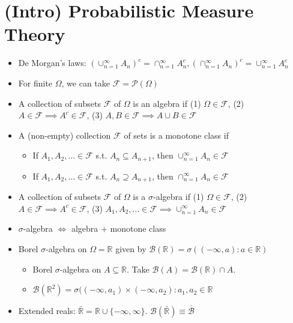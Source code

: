 \section{(Intro) Probabilistic Measure Theory}
\begin{itemize}
    \item De Morgan's laws: $\displaystyle\left(\cup_{n=1}^\infty A_n\right)^c = \cap_{n=1}^\infty A_n^c, \left(\cap_{n=1}^\infty A_n\right)^c = \cup_{n=1}^\infty A_n^c$
    \item For finite $\Omega$, we can take $\mathcal{F} = \mathcal{P}(\Omega)$
    \item A collection of subsets $\mathcal{F}$ of $\Omega$ is an algebra if (1) $\Omega \in \mathcal{F}$, (2) $A \in \mathcal{F} \implies A^c \in \mathcal{F}$, (3) $A, B \in \mathcal{F} \implies A \cup B \in \mathcal{F}$
    \item A (non-empty) collection $\mathcal{F}$ of sets is a monotone class if
    \begin{itemize}
        \item If $A_1, A_2, \dots \in \mathcal{F}$ s.t. $A_n \subseteq A_{n+1}$, then $\cup_{n=1}^\infty A_n \in \mathcal{F}$
        \item If $A_1, A_2, \dots \in \mathcal{F}$ s.t. $A_n \supseteq A_{n+1}$, then $\cap_{n=1}^\infty A_n \in \mathcal{F}$
    \end{itemize}
    \item A collection of subsets $\mathcal{F}$ of $\Omega$ is a $\sigma$-algebra if (1) $\Omega \in \mathcal{F}$, (2) $A \in \mathcal{F} \implies A^c \in \mathcal{F}$, (3) $A_1, A_2, \dots \in \mathcal{F} \implies \cup_{n=1}^\infty A_n \in \mathcal{F}$
    \item $\sigma$-algebra $\iff$ algebra + monotone class
    \item Borel $\sigma$-algebra on $\Omega = \mathbb{R}$ given by $\mathscr{B}(\mathbb{R}) = \sigma((-\infty, a) : a \in \mathbb{R})$
    \begin{itemize}
        \item Borel $\sigma$-algebra on $A \subseteq \mathbb{R}$. Take $\mathscr{B}(A) = \mathscr{B}(\mathbb{R}) \cap A.$
        \item $\mathscr{B}(\mathbb{R}^2) = \sigma((-\infty, a_1) \times (-\infty, a_2) : a_1, a_2 \in \mathbb{R}$
    \end{itemize}
    \item Extended reals: $\bar{\mathbb{R}} = \mathbb{R} \cup \{-\infty, \infty\}$. $\mathscr{B}(\bar{\mathbb{R}}) \equiv \bar{\mathscr{B}}$

\end{itemize}
